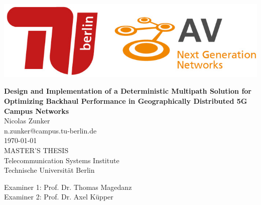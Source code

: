 
\thispagestyle{empty}

\begin{center}
\includegraphics[width=.67\linewidth, height=.2\linewidth]{fig/Logo_Header}
\end{center}
\begin{center}
    \LARGE{ \bfseries Design and Implementation of a Deterministic Multipath Solution for Optimizing Backhaul Performance in Geographically Distributed 5G Campus Networks}\\[2pc]

    \large{Nicolas Zunker}\\
    \large{n.zunker@campus.tu-berlin.de}\\[1pc]
    \large{\today}\\[2pc]

    MASTER'S THESIS\\
    Telecommunication Systems Institute\\
    Technische Universität Berlin
\end{center}
\vfill

Examiner 1: Prof. Dr. Thomas Magedanz
\hfill{}\\ %
Examiner 2: Prof. Dr. Axel Küpper

\afterpage{\null\thispagestyle{empty}\newpage}
